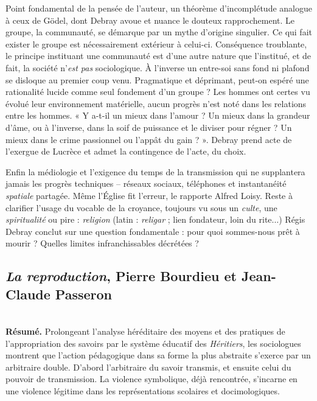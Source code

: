 \documentclass[11pt]{amsart}
\begin{document}
Point fondamental de la pensée de l'auteur, un théorème d'incomplétude analogue à ceux de Gödel, dont Debray avoue et nuance le douteux rapprochement. Le groupe, la communauté, se démarque par un mythe d'origine singulier. Ce qui fait exister le groupe est nécessairement extérieur à celui-ci. Conséquence troublante, le principe instituant une communauté est d'une autre nature que l'institué, et de fait, la société n'\textit{est pas} sociologique. À l'inverse un entre-soi sans fond ni plafond se disloque au premier coup venu. Pragmatique et déprimant, peut-on espéré une rationalité lucide comme seul fondement d'un groupe ? Les hommes ont certes vu évolué leur environnement matérielle, aucun progrès n'est noté dans les relations entre les hommes. « Y a-t-il un mieux dans l'amour ? Un mieux dans la grandeur d'âme, ou à l'inverse, dans la soif de puissance et le diviser pour régner ? Un mieux dans le crime passionnel ou l'appât du gain ? ». Debray prend acte de l'exergue de Lucrèce et admet la contingence de l'acte, du choix. 

Enfin la médiologie et l'exigence du temps de la transmission qui ne supplantera jamais les progrès techniques – réseaux sociaux, téléphones et instantanéité \textit{spatiale} partagée. Même l'\'Eglise fit l'erreur, le rapporte Alfred Loisy. Reste à clarifier l'usage du vocable de la croyance, toujours vu sous un \textit{culte}, une \textit{spiritualité} ou pire : \textit{religion} (latin : \textit{religar} ; lien fondateur, loin du rite...) Régis Debray conclut sur une question fondamentale : pour quoi sommes-nous prêt à mourir ? Quelles limites infranchissables décrétées ? 

\newpage 

\subsection*{\textsl{La reproduction}, Pierre Bourdieu et Jean-Claude Passeron}$ $\\

\textbf{Résumé.} Prolongeant l'analyse héréditaire des moyens et des pratiques de l'appropriation des savoirs par le système éducatif des \emph{Héritiers}, les sociologues montrent que l'action pédagogique dans sa forme la plus abstraite s'exerce par un arbitraire double. D'abord l'arbitraire du savoir transmis, et ensuite celui du pouvoir de transmission. La violence symbolique, déjà rencontrée, s'incarne en une violence légitime dans les représentations scolaires et docimologiques.
\end{document}
